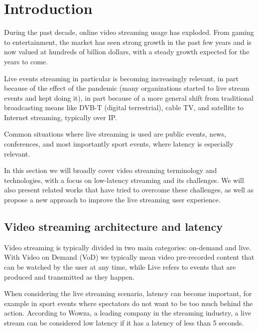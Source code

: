 \chapter{Introduction}
\label{cha:intro}

During the past decade, online video streaming usage has exploded. From gaming to entertainment, the market has seen strong growth in the past few years and is now valued at hundreds of billion dollars, with a steady growth expected for the years to come.\cite{cisco2019}



Live events streaming in particular is becoming increasingly relevant, in part because of the effect of the pandemic (many organizations started to live stream events and kept doing it), in part because of a more general shift from traditional broadcasting means like DVB-T (digital terrestrial), cable TV, and satellite to Internet streaming, typically over IP.

Common situations where live streaming is used are public events, news, conferences, and most importantly sport events, where latency is especially relevant.

In this section we will broadly cover video streaming terminology and technologies, with a focus on low-latency streaming and its challenges. We will also present related works that have tried to overcome these challenges, as well as propose a new approach to improve the live streaming user experience.

\section{Video streaming architecture and latency}
\label{sec:intro/architecture}

Video streaming is typically divided in two main categories: on-demand and live. With Video on Demand (VoD) we typically mean video pre-recorded content that can be watched by the user at any time, while Live refers to events that are produced and transmitted as they happen.

When considering the live streaming scenario, latency can become important, for example in sport events where spectators do not want to be too much behind the action. According to Wowza, a leading company in the streaming industry, a live stream can be considered low latency if it has a latency of less than 5 seconds.

